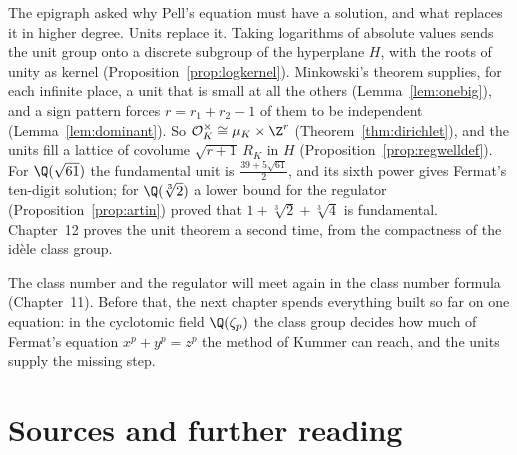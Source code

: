 The epigraph asked why Pell's equation must have a solution, and what replaces it in higher degree. Units replace it.
Taking logarithms of absolute values sends the unit group onto a discrete subgroup of the hyperplane $H$, with the roots of
unity as kernel (Proposition~\ref{prop:logkernel}). Minkowski's theorem supplies, for each infinite place, a unit that
is small at all the others (Lemma~\ref{lem:onebig}), and a sign pattern forces $r=r_1+r_2-1$ of them to be independent
(Lemma~\ref{lem:dominant}). So $\mathcal O_K^\times\cong\mu_K\times\Z^{r}$ (Theorem~\ref{thm:dirichlet}), and the units
fill a lattice of covolume $\sqrt{r+1}\,R_K$ in $H$ (Proposition~\ref{prop:regwelldef}). For $\Q(\sqrt{61})$ the
fundamental unit is $\frac{39+5\sqrt{61}}2$, and its sixth power gives Fermat's ten-digit solution; for $\Q(\sqrt[3]2)$ a
lower bound for the regulator (Proposition~\ref{prop:artin}) proved that $1+\sqrt[3]2+\sqrt[3]4$ is fundamental. Chapter~12
proves the unit theorem a second time, from the compactness of the id\`ele class group.

The class number and the regulator will meet again in the class number formula (Chapter~11). Before that, the next
chapter spends everything built so far on one equation: in the cyclotomic field $\Q(\zeta_p)$ the class group decides how
much of Fermat's equation $x^p+y^p=z^p$ the method of Kummer can reach, and the units supply the missing step.

\section*{Sources and further reading}

